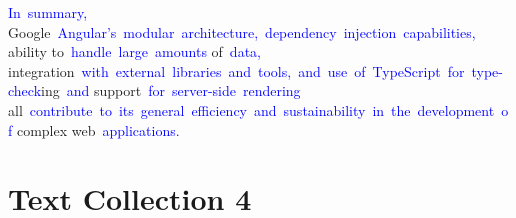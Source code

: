 \documentclass{article}
\begin{document}
\begin{tcolorbox}[colframe=black,colback=white]
\textcolor{blue}{In}\textcolor{blue}{~summary}\textcolor{blue}{,} Google\textcolor{blue}{~Angular}\textcolor{blue}{'s}\textcolor{blue}{~modular}\textcolor{blue}{~architecture}\textcolor{blue}{,}\textcolor{blue}{~dependency}\textcolor{blue}{~injection}\textcolor{blue}{~capabilities}\textcolor{blue}{,} ability to\textcolor{blue}{~handle}\textcolor{blue}{~large}\textcolor{blue}{~amounts} of\textcolor{blue}{~data}\textcolor{blue}{,} integration\textcolor{blue}{~with}\textcolor{blue}{~external}\textcolor{blue}{~libraries}\textcolor{blue}{~and}\textcolor{blue}{~tools}\textcolor{blue}{,}\textcolor{blue}{~and}\textcolor{blue}{~use}\textcolor{blue}{~of}\textcolor{blue}{~TypeScript}\textcolor{blue}{~for}\textcolor{blue}{~type}\textcolor{blue}{-check}ing\textcolor{blue}{~and} support\textcolor{blue}{~for}\textcolor{blue}{~server}\textcolor{blue}{-side}\textcolor{blue}{~rendering} all\textcolor{blue}{~contribute}\textcolor{blue}{~to}\textcolor{blue}{~its}\textcolor{blue}{~general}\textcolor{blue}{~efficiency}\textcolor{blue}{~and}\textcolor{blue}{~sustainability}\textcolor{blue}{~in}\textcolor{blue}{~the}\textcolor{blue}{~development}\textcolor{blue}{~of} complex web\textcolor{blue}{~applications}\textcolor{blue}{.}\textcolor{blue}{}
\end{tcolorbox}


\section*{Text Collection 4}
\end{document}
